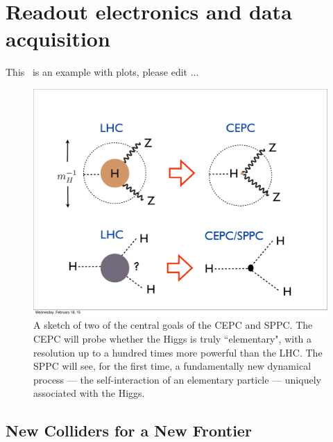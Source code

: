 \chapter{Readout electronics and data acquisition}
\label{Chapter:ReadoutDAQ}


This~\cite{cepc_website} is an example with plots, please edit ... 
%
\begin{figure}[h!]
\centering
\includegraphics[scale=0.36]{Figures/ReadoutDAQ/main_theme}
\caption{A sketch of two of the central goals of the CEPC and SPPC. The CEPC will probe whether the Higgs is truly ``elementary", with a resolution up to a hundred times more powerful than the LHC. The SPPC will see, for the first time, a fundamentally new dynamical process --- the self-interaction of an elementary particle --- uniquely associated with the Higgs.}
\label{fig:main_theme}
\end{figure}
%
\section{New Colliders for a New Frontier}


